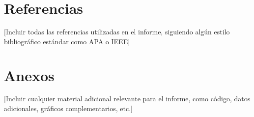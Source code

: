 \documentclass[12pt,letterpaper]{report}
\begin{document}
\chapter*{Referencias}

[Incluir todas las referencias utilizadas en el informe, siguiendo algún estilo bibliográfico estándar como APA o IEEE]

\chapter*{Anexos}

[Incluir cualquier material adicional relevante para el informe, como código, datos adicionales, gráficos complementarios, etc.]
\end{document}
